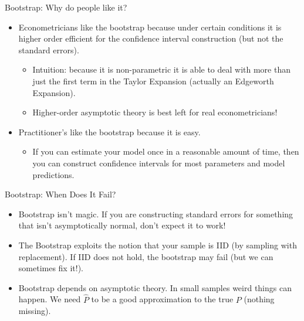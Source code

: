 \begin{frame}{Bootstrap: Why do people like it?}
\begin{itemize}
\item Econometricians like the bootstrap because under certain conditions it is \alert{higher order efficient} for the confidence interval construction (but not the standard errors).
\begin{itemize}
\item Intuition: because it is non-parametric it is able to deal with more than just the first term in the Taylor Expansion (actually an \alert{Edgeworth Expansion}).
\item Higher-order asymptotic theory is best left for real econometricians!
\end{itemize}
\item Practitioner's like the bootstrap because it is easy.
\begin{itemize}
\item If you can estimate your model once in a reasonable amount of time, then you can construct confidence intervals for most parameters and model predictions.
\end{itemize}
\end{itemize}
\end{frame}

\begin{frame}{Bootstrap: When Does It Fail?}
\begin{itemize}
\item Bootstrap isn't magic. If you are constructing standard errors for something that isn't asymptotically normal, don't expect it to work!
\item The Bootstrap exploits the notion that your sample is IID (by sampling with replacement). If IID does not hold, the bootstrap may fail (but we can sometimes fix it!).
\item Bootstrap depends on asymptotic theory. In small samples weird things can happen. We need $\hat{P}$ to be a good approximation to the true $P$ (nothing missing).
\end{itemize}
\end{frame}

